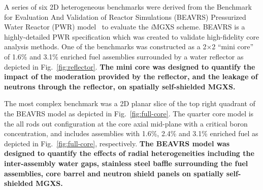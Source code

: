 \documentclass[12pt,twoside]{mitthesis-exec}
\begin{document}
A series of six 2D heterogeneous benchmarks were derived from the Benchmark for Evaluation And Validation of Reactor Simulations (BEAVRS) Pressurized Water Reactor (PWR) model~\cite{horelik2013beavrs} to evaluate the \textit{i}MGXS scheme. BEAVRS is a highly-detailed PWR specification which was created to validate high-fidelity core analysis methods. One of the benchmarks was constructed as a 2$\times$2 ``mini core'' of 1.6\% and 3.1\% enriched fuel assemblies surrounded by a water reflector as depicted in Fig.~\ref{fig:reflector}. \textbf{The mini core was designed to quantify the impact of the moderation provided by the reflector, and the leakage of neutrons through the reflector, on spatially self-shielded MGXS.}

The most complex benchmark was a 2D planar slice of the top right quadrant of the BEAVRS model as depicted in Fig.~\ref{fig:full-core}. The quarter core model is the all rods out configuration at the core axial mid-plane with a critical boron concentration, and includes assemblies with 1.6\%, 2.4\% and 3.1\% enriched fuel as depicted in Fig.~\ref{fig:full-core}, respectively. \textbf{The BEAVRS model was designed to quantify the effects of radial heterogeneities including the inter-assembly water gaps, stainless steel baffle surrounding the fuel assemblies, core barrel and neutron shield panels on spatially self-shielded MGXS.} 



 

\end{document}
